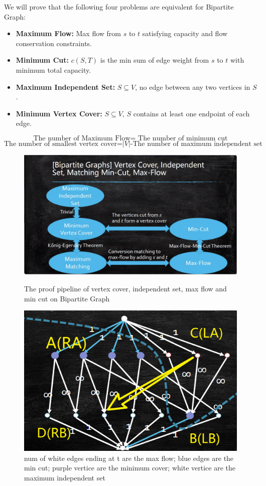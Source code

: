 We will prove that the following four problems are equivalent for Bipartite Graph:
\begin{itemize}
    \item \textbf{Maximum Flow:} Max flow from $s$ to $t$ satisfying capacity and flow conservation constraints.
    \item \textbf{Minimum Cut:} $c(S,T)$ is the min sum of edge weight from $s$ to $t$ with minimum total capacity.
    \item \textbf{Maximum Independent Set:} $S\subseteq V$, no edge between any two vertices in $S$.
    \item \textbf{Minimum Vertex Cover:} $S\subseteq V$, $S$ contains at least one endpoint of each edge.
\end{itemize}
\[\text{The number of Maximum Flow= The number of minimum cut}\]
\[\text{The number of smallest vertex cover=$|V|$-The number of maximum independent set}\]
\begin{figure}[htbp]
    \centering
    \begin{minipage}{0.48\linewidth}
        \centering
        \includegraphics[width=1\linewidth]{Notes/fig/relation_Flow.png}
        \caption{The proof pipeline of vertex cover, independent set, max flow and min cut on Bipartite Graph}
        \label{fig:MBG}
    \end{minipage}
    \begin{minipage}{0.48\linewidth}
        \centering
        \includegraphics[width=0.8\linewidth]{Notes/fig/Network_Prove.png}
        \caption{num of white edges ending at t are the max flow; blue edges are the min cut; purple vertice are the minimum cover; white vertice are the maximum independent set}
        \label{fig:Network_Prove}
    \end{minipage}
\end{figure}
